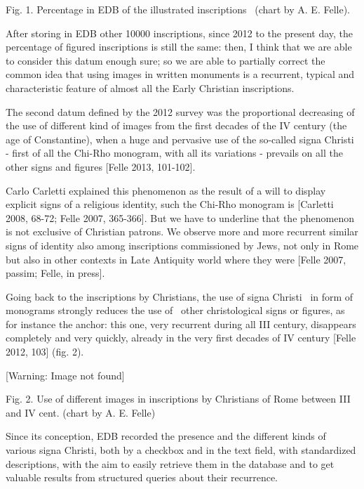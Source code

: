 \documentclass[amsthm,ebook]{saparticle}
\begin{document}
Fig. 1. Percentage in EDB of the {\textquotedbl}illustrated inscriptions{\textquotedbl} \ (chart by A. E. Felle).


\bigskip

After storing in EDB other 10000 inscriptions, since 2012 to the present day, the percentage of figured inscriptions is
still the same: then, I think that we are able to consider this datum enough sure; so we are able to partially correct
the common idea that using images in written monuments is a recurrent, typical and characteristic feature of almost all
the Early Christian inscriptions.

The second datum defined by the 2012 survey was the proportional decreasing of the use of different kind of images from
the first decades of the IV century (the age of Constantine), when a huge and pervasive use of the so-called signa
Christi - first of all the Chi-Rho monogram, with all its variations - prevails on all the other signs and figures
[Felle 2013, 101-102].

Carlo Carletti explained this phenomenon as the result of a will to display explicit signs of a religious identity, such
the Chi-Rho monogram is [Carletti 2008, 68-72; Felle 2007, 365-366]. But we have to underline that the phenomenon is
not exclusive of Christian patrons. We observe more and more recurrent similar {\textquotedbl}signs of
identity{\textquotedbl} also among inscriptions commissioned by Jews, not only in Rome but also in other contexts in
Late Antiquity world where they were [Felle 2007, passim; Felle, in press]. \ \ 

Going back to the inscriptions by Christians, the use of signa Christi \ in form of monograms strongly reduces the use
of \ other christological signs or figures, as for instance the anchor: this one, very recurrent during all III
century, disappears completely and very quickly, already in the very first decades of IV century [Felle 2012, 103]
(fig. 2).


\bigskip

 [Warning: Image not found] 

Fig. 2. Use of different images in inscriptions by Christians of Rome between III and IV cent. (chart by A. E. Felle)


\bigskip

Since its conception, EDB recorded the presence and the different kinds of various signa Christi, both by a checkbox and
in the text field, with standardized descriptions, with the aim to easily retrieve them in the database and to get
valuable results from structured queries about their recurrence.
\end{document}
